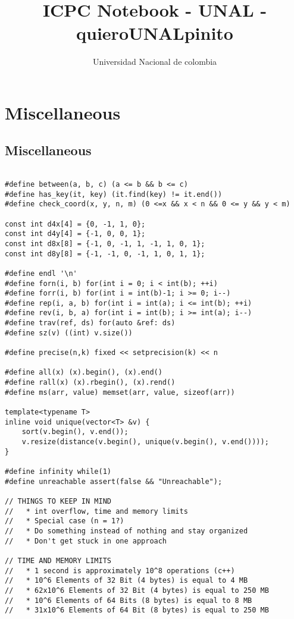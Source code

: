 \documentclass[10pt,letterpaper,twocolumn,twosided]{article}
\begin{document}
\title{ICPC Notebook - UNAL - quieroUNALpinito}
\author{Universidad Nacional de colombia}
\maketitle
\tableofcontents
{}

\section{Miscellaneous}

\subsection{Miscellaneous}
\begin{lstlisting}

#define between(a, b, c) (a <= b && b <= c)
#define has_key(it, key) (it.find(key) != it.end())
#define check_coord(x, y, n, m) (0 <=x && x < n && 0 <= y && y < m)

const int d4x[4] = {0, -1, 1, 0};
const int d4y[4] = {-1, 0, 0, 1};
const int d8x[8] = {-1, 0, -1, 1, -1, 1, 0, 1};
const int d8y[8] = {-1, -1, 0, -1, 1, 0, 1, 1};

#define endl '\n'
#define forn(i, b) for(int i = 0; i < int(b); ++i)
#define forr(i, b) for(int i = int(b)-1; i >= 0; i--)
#define rep(i, a, b) for(int i = int(a); i <= int(b); ++i)
#define rev(i, b, a) for(int i = int(b); i >= int(a); i--)
#define trav(ref, ds) for(auto &ref: ds)
#define sz(v) ((int) v.size())

#define precise(n,k) fixed << setprecision(k) << n

#define all(x) (x).begin(), (x).end()
#define rall(x) (x).rbegin(), (x).rend()
#define ms(arr, value) memset(arr, value, sizeof(arr))

template<typename T>
inline void unique(vector<T> &v) {
    sort(v.begin(), v.end());
    v.resize(distance(v.begin(), unique(v.begin(), v.end())));
}

#define infinity while(1)
#define unreachable assert(false && "Unreachable");

// THINGS TO KEEP IN MIND
//   * int overflow, time and memory limits
//   * Special case (n = 1?)
//   * Do something instead of nothing and stay organized
//   * Don't get stuck in one approach
 
// TIME AND MEMORY LIMITS
//   * 1 second is approximately 10^8 operations (c++)
//   * 10^6 Elements of 32 Bit (4 bytes) is equal to 4 MB
//   * 62x10^6 Elements of 32 Bit (4 bytes) is equal to 250 MB
//   * 10^6 Elements of 64 Bits (8 bytes) is equal to 8 MB
//   * 31x10^6 Elements of 64 Bit (8 bytes) is equal to 250 MB


\end{lstlisting}
\end{document}
